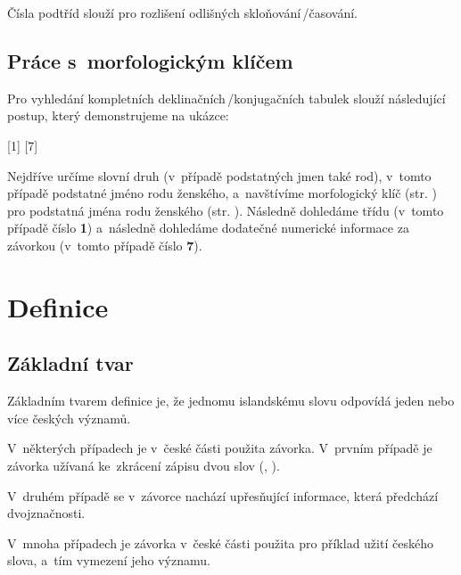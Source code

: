 Čísla podtříd slouží pro rozlišení odlišných skloňování\,/\addthin časování.

\subsection*{Práce s~morfologickým klíčem}

Pro vyhledání kompletních deklinačních\,/\addthin konjugačních tabulek slouží následující postup, který demonstrujeme na ukázce:

\blspace
  \dicEntry {} [1] [7]
\blspace

Nejdříve určíme slovní druh (v~případě podstatných jmen také rod), v~tomto případě podstatné jméno rodu ženského, a~navštívíme morfologický klíč (str. \pageref{sec:morpho}) pro podstatná jména rodu ženského (str. \pageref{sec:morpho_f}).
Následně dohledáme třídu (v~tomto případě číslo \textbf{1}) a~následně dohledáme dodatečné numerické informace za závorkou (v~tomto případě číslo \textbf{7}).

\blspace
\tableC
\blspace

\section{Definice}

\subsection*{Základní tvar}

Základním tvarem definice je, že jednomu islandskému slovu odpovídá jeden nebo více českých významů.

\blspace
  \dicEntry {}   
\blspace

V~některých případech je v~české části použita závorka. V~prvním případě je závorka užívaná ke~zkrácení zápisu dvou slov (, ).

\blspace
  \dicEntry {}   
\blspace

V~druhém případě se v~závorce nachází upřesňující informace, která předchází dvojznačnosti.

\blspace
  \dicEntry {}    {\footnotesize {}}
\blspace

V~mnoha případech je závorka v~české části použita pro příklad užití českého slova, a~tím vymezení jeho významu.

